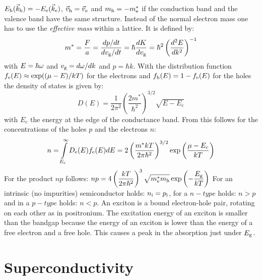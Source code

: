 $E_{\rm h}(\vec{k}_{\rm h})=-E_{\rm e}(\vec{k}_{\rm e})$,
$\vec{v}_{\rm h}=\vec{v}_{\rm e}$ and $m_{\rm h}=-m_{\rm e}^*$ if the conduction band
and the valence band have the same structure.
\npar
Instead of the normal electron mass one has to use the {\it effective mass}
within a lattice. It is defined by:
\[
m^*=\frac{F}{a}=\frac{dp/dt}{dv_{\rm g}/dt}=\hbar\frac{dK}{dv_{\rm g}}=
\hbar^2\left(\frac{d^2E}{dk^2}\right)^{-1}
\]
with $E=\hbar\omega$ and $v_{\rm g}=d\omega/dk$ and $p=\hbar k$.
\npar
With the distribution function $f_{\rm e}(E)\approx\exp((\mu-E)/kT)$ for the
electrons and $f_{\rm h}(E)=1-f_{\rm e}(E)$ for the holes the density of
states is given by:
\[
D(E)=\frac{1}{2\pi^2}\left(\frac{2m^*}{\hbar^2}\right)^{3/2}\sqrt{E-E_c}
\]
with $E_c$ the energy at the edge of the conductance band. From this follows
for the concentrations of the holes $p$ and the electrons $n$:
\[
n=\int\limits_{E_c}^{\infty}D_{\rm e}(E)f_{\rm e}(E)dE=2\left(\frac{m^*kT}{2\pi\hbar^2}
\right)^{3/2}\exp\left(\frac{\mu-E_c}{kT}\right)
\]
For the product $np$ follows:
$\displaystyle np=4\left(\frac{kT}{2\pi\hbar^2}\right)^3
\sqrt{m^*_{\rm e}m_{\rm h}}\exp\left(-\frac{E_{\rm g}}{kT}\right)$
\npar
For an intrinsic (no impurities) semiconductor holds: $n_{\rm i}=p_{\rm i}$,
for a $n-type$ holds: $n>p$ and in a $p-type$ holds: $n<p$.
\npar
An exciton is a bound electron-hole pair, rotating on each other as in
positronium. The excitation energy of an exciton is smaller than the bandgap
because the energy of an exciton is lower than the energy of a free electron
and a free hole. This causes a peak in the absorption just under $E_{\rm g}$.

\section{Superconductivity}
